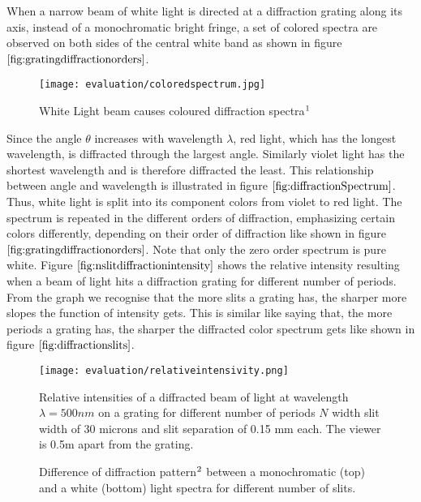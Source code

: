 When a narrow beam of white light is directed at a diffraction grating along its axis, instead of a monochromatic bright fringe, a set of colored spectra are observed on both sides of the central white band as shown in figure $\ref{fig:gratingdiffractionorders}$.

\begin{figure}[H]
  \centering
  \texttt{[image: evaluation/coloredspectrum.jpg]}
  \caption[Diffracted White Light]{White Light beam causes coloured diffraction spectra$\footnotemark$}
  \label{fig:diffractionSpectrum}
\end{figure}


Since the angle $\theta$ increases with wavelength $\lambda$, red light, which has the longest wavelength, is diffracted through the largest angle. Similarly violet light has the shortest wavelength and is therefore diffracted the least. This relationship between angle and wavelength is illustrated in figure $\ref{fig:diffractionSpectrum}$. Thus, white light is split into its component colors from violet to red light. The spectrum is repeated in the different orders of diffraction, emphasizing certain colors differently, depending on their order of diffraction like shown in figure $\ref{fig:gratingdiffractionorders}$. Note that only the zero order spectrum is pure white.  
Figure $\ref{fig:nslitdiffractionintensity}$ shows the relative intensity resulting when a beam of light hits a diffraction grating for different number of periods. From the graph we recognise that the more slits a grating has, the sharper more slopes the function of intensity gets. This is similar like saying that, the more periods a grating has, the sharper the diffracted color spectrum gets like shown in figure $\ref{fig:diffractionslits}$. 

\begin{figure}[H]
  \centering
  \texttt{[image: evaluation/relativeintensivity.png]}
  \caption[Intensity Plots for Different Number of Slits]{Relative intensities of a diffracted beam of light at wavelength $\lambda=500nm$ on a grating for different number of periods $N$ width slit width of 30 microns and slit separation of 0.15 mm each. The viewer is 0.5m apart from the grating.}
  \label{fig:nslitdiffractionintensity}
\end{figure}

\begin{figure}[H]
  \centering
  
\caption[N Slit Diffraction Grating Pattern]{Difference of diffraction pattern$\footnotemark$ between a monochromatic (top) and a white (bottom) light spectra for different number of slits.}
\label{fig:diffractionslits}
\end{figure}

